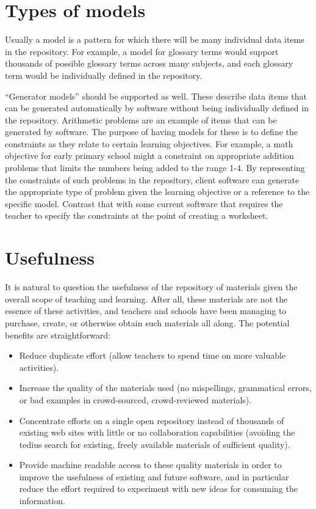 \section*{Types of models}

Usually a model is a pattern for which there will be many individual
data items in the repository.  For example, a model for glossary terms would support
thousands of possible glossary terms across many subjects, and each
glossary term would be individually defined in the repository.

``Generator models'' should be supported as well.  These describe
data items that can be generated automatically by software without being
individually defined in the repository.  Arithmetic problems are an
example of items that can be generated by software.
The purpose of having models for these is
to define the constraints as they relate to certain learning objectives.
For example, a math objective for early primary school might a constraint
on appropriate addition problems that limits the numbers being added to the
range 1-4.  By representing the constraints of such problems in
the repository, client software can generate
the appropriate type of problem given the learning objective or a reference
to the specific model.  Contrast that with some current software that
requires the teacher to specify the constraints at the point of creating
a worksheet.

\section*{Usefulness}

It is natural to question the usefulness of the repository of materials
given the overall scope of teaching and learning.  After all, these materials are
not the essence of these activities, and teachers and schools have
been managing to purchase, create, or otherwise obtain such materials all
along.  The potential benefits are straightforward:

\begin{itemize}
\item Reduce duplicate effort (allow teachers to spend time on more valuable
activities).
\item Increase the quality of the materials used (no mispellings, grammatical 
errors,
or bad examples in crowd-sourced, crowd-reviewed materials).
\item Concentrate efforts on a single open repository instead of thousands of
existing web sites with little or no collaboration capabilities (avoiding the
tedius search for existing, freely available materials of sufficient quality).
\item Provide machine readable access to these quality materials in order to
improve the usefulness of existing and future software, and in particular
reduce the effort required to experiment with new ideas for consuming the
information.

\end{itemize}

